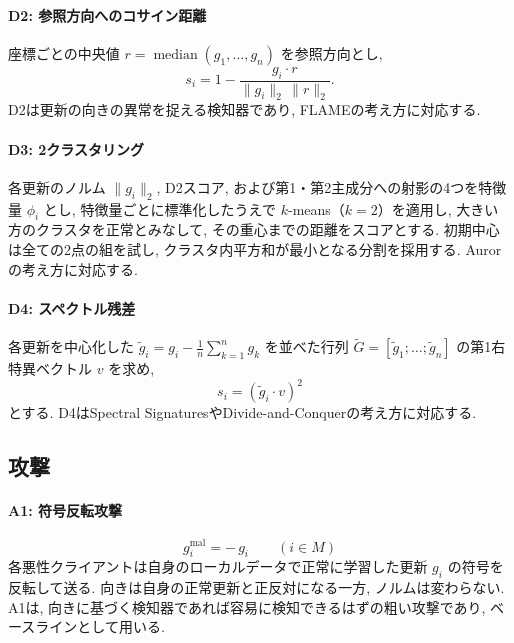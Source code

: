 \documentclass[a4j, dvipdfmx]{jsarticle}
\begin{document}
\paragraph{D2: 参照方向へのコサイン距離}
座標ごとの中央値 $r = \operatorname{median}(g_1,\dots,g_n)$ を参照方向とし,
\begin{equation}
s_i = 1 - \frac{g_i \cdot r}{\|g_i\|_2\,\|r\|_2}.
\end{equation}
D2は更新の向きの異常を捉える検知器であり, FLAME\cite{nguyen2022flame}の考え方に対応する.

\paragraph{D3: 2クラスタリング}
各更新のノルム $\|g_i\|_2$, D2スコア, および第1・第2主成分への射影の4つを特徴量 $\phi_i$ とし, 特徴量ごとに標準化したうえで $k$-means（$k=2$）を適用し, 大きい方のクラスタを正常とみなして, その重心までの距離をスコアとする. 初期中心は全ての2点の組を試し, クラスタ内平方和が最小となる分割を採用する. Auror\cite{shen2016auror}の考え方に対応する.

\paragraph{D4: スペクトル残差}
各更新を中心化した $\tilde{g}_i = g_i - \frac{1}{n}\sum_{k=1}^{n} g_k$ を並べた行列 $\tilde{G} = [\tilde{g}_1;\dots;\tilde{g}_n]$ の第1右特異ベクトル $v$ を求め,
\begin{equation}
s_i = (\tilde{g}_i \cdot v)^2
\end{equation}
とする. D4はSpectral Signatures\cite{tran2018spectral}やDivide-and-Conquer\cite{shejwalkar2021manipulating}の考え方に対応する.

\subsection{攻撃}
\label{sec:attacks}

\paragraph{A1: 符号反転攻撃}
\begin{equation}
g_i^{\text{mal}} = -\,g_i \qquad (i \in M)
\end{equation}
各悪性クライアントは自身のローカルデータで正常に学習した更新 $g_i$ の符号を反転して送る. 向きは自身の正常更新と正反対になる一方, ノルムは変わらない. A1は, 向きに基づく検知器であれば容易に検知できるはずの粗い攻撃であり, ベースラインとして用いる.
\end{document}
